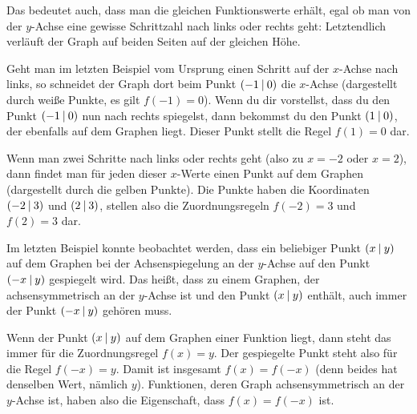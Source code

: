 \documentclass[../../main.tex]{subfiles}
\begin{document}
Das bedeutet auch, dass man die gleichen Funktionswerte erhält, egal ob man von der $y$-Achse eine gewisse Schrittzahl nach links oder rechts geht: Letztendlich verläuft der Graph auf beiden Seiten auf der gleichen Höhe.

\begin{example}{}
    Geht man im letzten Beispiel vom Ursprung einen Schritt auf der $x$-Achse nach links, so schneidet der Graph dort beim Punkt $\left(-1 \:\middle|\: 0\right)$ die $x$-Achse (dargestellt durch weiße Punkte, es gilt $f(-1)=0$). Wenn du dir vorstellst, dass du den Punkt $\left(-1 \:\middle|\: 0\right)$ nun nach rechts spiegelst, dann bekommst du den Punkt $\left(1 \:\middle|\: 0\right)$, der ebenfalls auf dem Graphen liegt. Dieser Punkt stellt die Regel $f(1)=0$ dar.
    
    Wenn man zwei Schritte nach links oder rechts geht (also zu $x=-2$ oder $x=2$), dann findet man für jeden dieser $x$-Werte einen Punkt auf dem Graphen (dargestellt durch die gelben Punkte). Die Punkte haben die Koordinaten $\left(-2 \:\middle|\: 3\right)$ und $\left(2 \:\middle|\: 3\right)$, stellen also die Zuordnungsregeln $f(-2)=3$ und $f(2)=3$ dar.
\end{example}

Im letzten Beispiel konnte beobachtet werden, dass ein beliebiger Punkt $\left(x \:\middle|\: y\right)$ auf dem Graphen bei der Achsenspiegelung an der $y$-Achse auf den Punkt $\left(-x \:\middle|\: y\right)$ gespiegelt wird. Das heißt, dass zu einem Graphen, der achsensymmetrisch an der $y$-Achse ist und den Punkt $\left(x \:\middle|\: y\right)$ enthält, auch immer der Punkt $\left(-x \:\middle|\: y\right)$ gehören muss.

Wenn der Punkt $\left(x \:\middle|\: y\right)$ auf dem Graphen einer Funktion liegt, dann steht das immer für die Zuordnungsregel $f(x)=y$. Der gespiegelte Punkt steht also für die Regel $f(-x)=y$. Damit ist insgesamt $f(x)=f(-x)$ (denn beides hat denselben Wert, nämlich $y$). Funktionen, deren Graph achsensymmetrisch an der $y$-Achse ist, haben also die Eigenschaft, dass $f(x)=f(-x)$ ist.
\end{document}
